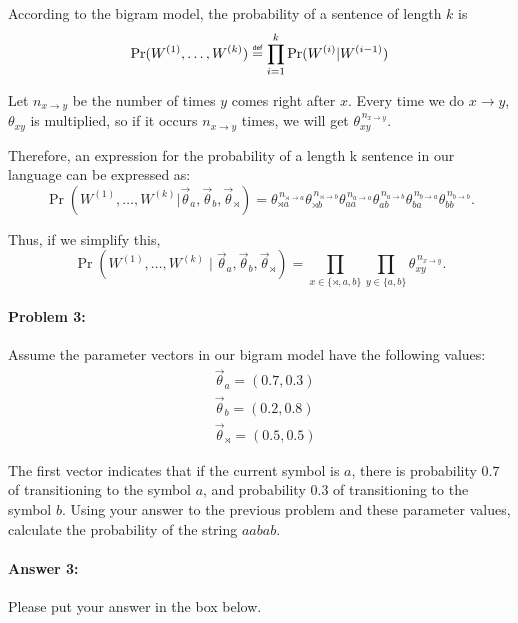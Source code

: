 \documentclass[10pt]{article}
\newenvironment{AnswerBox}{\begin{mdframed}[style=simple]}{\end{mdframed}}
\newcommand\defeq{\mathrel{\overset{\makebox[0pt]{\mbox{\normalfont\tiny\sffamily def}}}{=}}}
\begin{document}
\begin{AnswerBox}%

    According to the bigram model, the probability of a sentence of length $k$ is
    \[
    \Pr(W^{(1)},\dots,W^{(k)})
    \defeq\prod_{i=1}^k \Pr(W^{(i)} | W^{(i-1)})
    \]
    
    Let $n_{x \to y}$ be the number of times $y$ comes right after $x$.
    Every time we do $x \to y$, $\theta_{xy}$ is multiplied, so if it occurs $n_{x \to y}$ times, we will get $\theta_{xy}^{\,n_{x \to y}}$.
    
    Therefore, an expression for the probability of a length k sentence in our language can be expressed as:
    \[
    \Pr(W^{(1)},\dots,W^{(k)} | \vec{\theta}_{a}, \vec{\theta}_{b}, \vec{\theta}_{\rtimes})
    = \theta_{\rtimes a}^{\,n_{\rtimes \to a}}
    \theta_{\rtimes b}^{\,n_{\rtimes \to b}}
    \theta_{aa}^{\,n_{a \to a}}
    \theta_{ab}^{\,n_{a \to b}}
    \theta_{ba}^{\,n_{b \to a}}
    \theta_{bb}^{\,n_{b \to b}}.
    \]
    
    Thus, if we simplify this,
    \[
    \Pr(W^{(1)},\dots,W^{(k)} \mid \vec{\theta}_a, \vec{\theta}_b, \vec{\theta}_{\rtimes})
    = \prod_{x \in \{\rtimes, a, b\}}
    \prod_{y \in \{a, b\}}
    \theta_{xy}^{\,n_{x \to y}}.
    \]
    
\end{AnswerBox}%

\hrulefill %

\paragraph{Problem 3:}


Assume the parameter vectors in our bigram model have the following values:
\begin{align*}
&\vec{\theta}_{a} = (0.7,0.3)\\
&\vec{\theta}_{b} = (0.2,0.8)\\
&\vec{\theta}_{\rtimes} = (0.5,0.5)
\end{align*}

 The first vector indicates that if the current symbol is $a$,
there is probability $0.7$ of transitioning to the symbol $a$, and
probability $0.3$ of transitioning to the symbol $b$. Using your
answer to the previous problem and these parameter values, calculate
the probability of the string $aabab$.

\paragraph{Answer 3:} Please put your answer in the box below.
\end{document}
